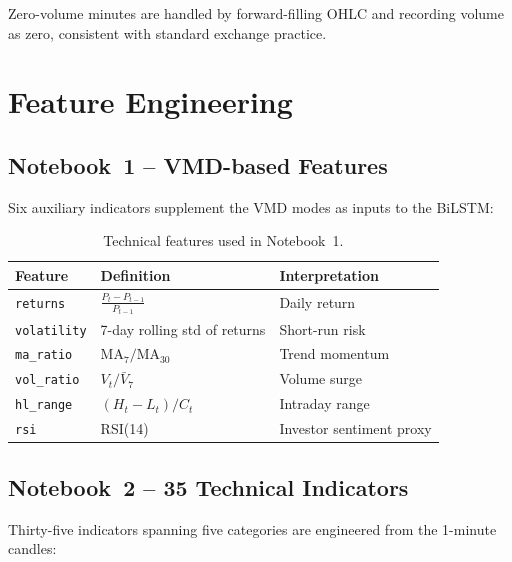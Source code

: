\documentclass[12pt,a4paper]{article}
\begin{document}
Zero-volume minutes are handled by forward-filling OHLC and recording volume
as zero, consistent with standard exchange practice.

\section{Feature Engineering}
\label{sec:features}

\subsection{Notebook~1 -- VMD-based Features}

Six auxiliary indicators supplement the VMD modes as inputs to the BiLSTM:

\begin{table}[H]
  \centering
  \caption{Technical features used in Notebook~1.}
  \label{tab:feat1}
  \begin{tabular}{lll}
    \toprule
    Feature & Definition & Interpretation \\
    \midrule
    \texttt{returns}    & $\frac{P_t - P_{t-1}}{P_{t-1}}$ & Daily return \\
    \texttt{volatility} & 7-day rolling std of returns & Short-run risk \\
    \texttt{ma\_ratio}  & $\text{MA}_7 / \text{MA}_{30}$ & Trend momentum \\
    \texttt{vol\_ratio} & $V_t / \bar V_{7}$ & Volume surge \\
    \texttt{hl\_range}  & $(H_t - L_t) / C_t$ & Intraday range \\
    \texttt{rsi}        & RSI(14) & Investor sentiment proxy \\
    \bottomrule
  \end{tabular}
\end{table}

\subsection{Notebook~2 -- 35 Technical Indicators}

Thirty-five indicators spanning five categories are engineered from the
1-minute candles:
\end{document}
